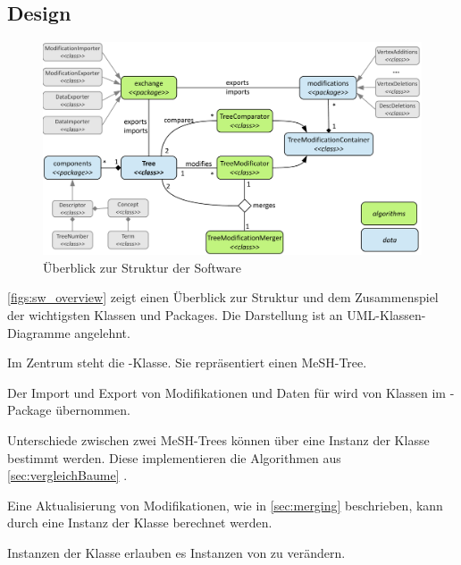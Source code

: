 \subsection{Design}

\begin{figure}[h]
\begin{center}
\includegraphics[width=1.0\textwidth]{figs/sw_overview3.pdf}
\end{center}
\caption{Überblick zur Struktur der Software}
\label{figs:sw_overview}
\end{figure}

\autoref{figs:sw_overview} zeigt einen Überblick zur Struktur und dem Zusammenspiel der wichtigsten Klassen und Packages. Die Darstellung ist an UML-Klassen-Diagramme angelehnt. \par

Im Zentrum steht die -Klasse. Sie repräsentiert einen MeSH-Tree. \par

Der Import und Export von Modifikationen und Daten für  wird von Klassen im -Package übernommen. \par

Unterschiede zwischen zwei MeSH-Trees können über eine Instanz der Klasse  bestimmt werden. Diese implementieren die Algorithmen aus \ref{sec:vergleichBaume} . \par

Eine Aktualisierung von Modifikationen, wie in \ref{sec:merging}  beschrieben, kann durch eine Instanz der Klasse  berechnet werden.\par

Instanzen der Klasse  erlauben es Instanzen von  zu verändern.\par

